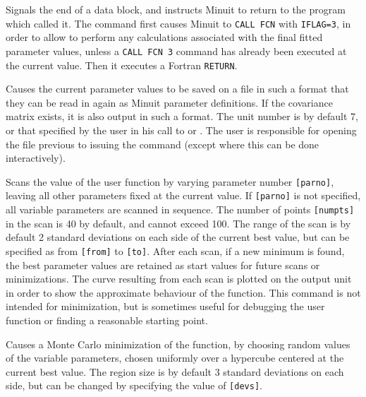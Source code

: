 
Signals the end of a data block, and instructs Minuit to
return to the program which called it.
The  command first causes Minuit to \texttt{CALL FCN} 
with \texttt{IFLAG=3},
in order to allow  to perform any calculations associated with
the final fitted parameter values,
unless a \texttt{CALL FCN 3} command has already been executed
at the current  value.
Then it executes a Fortran \texttt{RETURN}.


Causes the current parameter values to be saved on a file in such a
format that they can be read in again as Minuit parameter definitions.
If the covariance matrix exists, it is also output in such a format.
The unit number is by default 7, or that specified by the user in
his call to  or .
The user is responsible for opening the file previous to
issuing the  command 
(except where this can be done interactively).


Scans the value of the user function by varying parameter number
\texttt{[parno]}, leaving all other parameters fixed at the current value.
If \texttt{[parno]} is not specified, all variable parameters are scanned in
sequence. The number of points \texttt{[numpts]} in the scan is 40 by default,
and cannot exceed 100.
The range of the scan is by default 2 standard deviations on each side
of the current best value, but can be specified as from 
\texttt{[from]} to \texttt{[to]}.
After each scan, if a new minimum is found, the best parameter values
are retained as start values for future scans or minimizations.
The curve resulting from each scan is plotted on the output unit
in order to show the approximate behaviour of the function.
This command is not intended for minimization, but is sometimes useful
for debugging the user function or finding a reasonable starting point.


Causes a Monte Carlo minimization of the function, by choosing
random values of the variable parameters, chosen uniformly over a
hypercube centered at the current best value.  The region size is by
default 3 standard deviations on each side, but can be changed by
specifying the value of \texttt{[devs]}.


